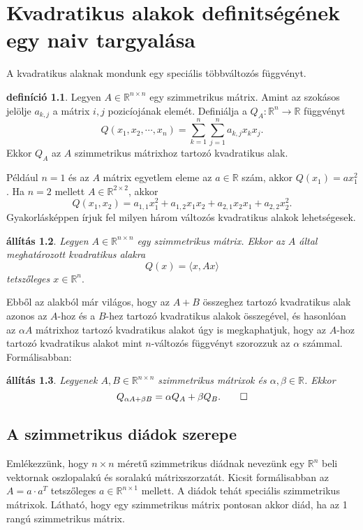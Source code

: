 \documentclass[9pt, a4paper, showtrims]{memoir}
\theoremstyle{plain}
\newtheorem{proposition}{állítás}[chapter]
\theoremstyle{remark}
\theoremstyle{definition}
\newtheorem{definition}[proposition]{definíció}
\newcommand{\ip}[2]{\langle#1,#2\rangle}
\begin{document}
\chapter{Kvadratikus alakok definitségének egy naiv targyalása}
A kvadratikus alaknak mondunk egy speciális többváltozós függvényt.
\begin{definition}
    Legyen $A\in\mathbb{R}^{n\times n}$ egy szimmetrikus mátrix.
    Amint az szokásos jelölje $a_{k,j}$ a mátrix $i,j$ pozicíojának elemét.
    Definiálja a $Q_A:\mathbb{R}^n\to\mathbb{R}$ függvényt
    \[
    Q\left( x_{1},x_2,\cdots,x_n \right)=
    \sum_{k=1}^n\sum_{j=1}^na_{k,j}x_kx_j.
    \]
    Ekkor $Q_A$ az $A$ szimmetrikus mátrixhoz tartozó kvadratikus alak.
\end{definition}
Például $n=1$ és az $A$ mátrix egyetlem eleme az $a\in\mathbb{R}$ szám, akkor $Q(x_1)=ax_1^2$.
Ha $n=2$ mellett $A\in\mathbb{R}^{2\times 2}$, akkor
$$
Q\left( x_1,x_2 \right)=a_{1,1}x_1^2+a_{1,2}x_1x_2+a_{2,1}x_2x_1+a_{2,2}x_2^2.
$$
Gyakorlásképpen írjuk fel milyen három változós kvadratikus alakok lehetségesek.
\begin{proposition}
    Legyen $A\in\mathbb{R}^{n\times n}$ egy szimmetrikus mátrix.
    Ekkor az $A$ által meghatározott kvadratikus alakra
    \[
        Q(x)=\ip{x}{Ax}
    \]
    tetszőleges $x\in\mathbb{R}^n.$
\end{proposition}
Ebből az alakból már világos, hogy az $A+B$ összeghez tartozó kvadratikus alak azonos az $A$-hoz és a $B$-hez
tartozó kvadratikus alakok összegével, 
és hasonlóan az $\alpha A$ mátrixhoz tartozó kvadratikus alakot úgy is megkaphatjuk, hogy az $A$-hoz tartozó kvadratikus alakot mint $n$-változós függvényt szorozzuk az $\alpha$ számmal.
Formálisabban:
\begin{proposition}
    Legyenek $A,B\in\mathbb{R}^{n\times n}$ szimmetrikus mátrixok és $\alpha,\beta\in\mathbb{R}$.
    Ekkor
    \[
    Q_{\alpha A+\beta B}=\alpha Q_A+\beta Q_B.
    \qedhere
    \]
\end{proposition}
\section{A szimmetrikus diádok szerepe}
Emlékezzünk, hogy $n\times n$ méretű szimmetrikus diádnak nevezünk egy $\mathbb{R}^n$ beli vektornak
oszlopalakú és soralakú mátrixszorzatát. 
Kicsit formálisabban az $A=a\cdot a^T$ tetszőleges $a\in\mathbb{R}^{n\times 1}$ mellett.
A diádok tehát speciális szimmetrikus mátrixok.
Látható, hogy egy szimmetrikus mátrix pontosan akkor diád, 
ha az 1 rangú szimmetrikus mátrix.
\end{document}

